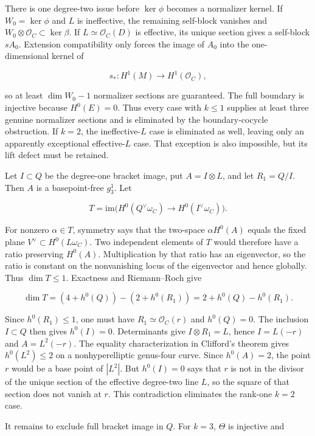 \documentclass[11pt]{article}
\theoremstyle{definition}
\begin{document}
There is one degree-two issue before \(\ker\phi\) becomes a normalizer
kernel. If \(W_0=\ker\phi\) and \(L\) is ineffective, the remaining
self-block vanishes and \(W_0\otimes\mathcal O_C\subset\ker\beta\). If
\(L\simeq\mathcal O_C(D)\) is effective, its unique section gives a
self-block \(sA_0\). Extension compatibility only forces the image of
\(A_0\) into the one-dimensional kernel of

\[s_*:H^1(M)\longrightarrow H^1(\mathcal O_C),\]

so at least \(\dim W_0-1\) normalizer sections are guaranteed. The full
boundary is injective because \(H^0(E)=0\). Thus every case with
\(k\le1\) supplies at least three genuine normalizer sections and is
eliminated by the boundary-cocycle obstruction. If \(k=2\), the
ineffective-\(L\) case is eliminated as well, leaving only an apparently
exceptional effective-\(L\) case. That exception is also impossible, but
its lift defect must be retained.

Let \(I\subset Q\) be the degree-one bracket image, put
\(A=I\otimes L\), and let \(R_1=Q/I\). Then \(A\) is a basepoint-free
\(g^1_3\). Let

\[T=\mathrm{im}\bigl(H^0(Q^\vee\omega_C)
  \longrightarrow H^0(I^\vee\omega_C)\bigr).\]

For nonzero \(\alpha\in T\), symmetry says that the two-space
\(\alpha H^0(A)\) equals the fixed plane
\(V^\vee\subset H^0(L\omega_C)\). Two independent elements of \(T\)
would therefore have a ratio preserving \(H^0(A)\). Multiplication by
that ratio has an eigenvector, so the ratio is constant on the
nonvanishing locus of the eigenvector and hence globally. Thus
\(\dim T\le1\). Exactness and Riemann--Roch give

\[\dim T=(4+h^0(Q))-(2+h^0(R_1))
      =2+h^0(Q)-h^0(R_1).\]

Since \(h^0(R_1)\le1\), one must have \(R_1\simeq\mathcal O_C(r)\) and
\(h^0(Q)=0\). The inclusion \(I\subset Q\) then gives \(h^0(I)=0\).
Determinants give \(I\otimes R_1=L\), hence \(I=L(-r)\) and
\(A=L^2(-r)\). The equality characterization in
Clifford's theorem gives \(h^0(L^2)\le2\) on a
nonhyperelliptic genus-four curve. Since \(h^0(A)=2\), the point \(r\)
would be a base point of \(|L^2|\). But \(h^0(I)=0\) says that \(r\) is
not in the divisor of the unique section of the effective degree-two
line \(L\), so the square of that section does not vanish at \(r\). This
contradiction eliminates the rank-one \(k=2\) case.

It remains to exclude full bracket image in \(Q\). For \(k=3\),
\(\Theta\) is injective and
\end{document}

